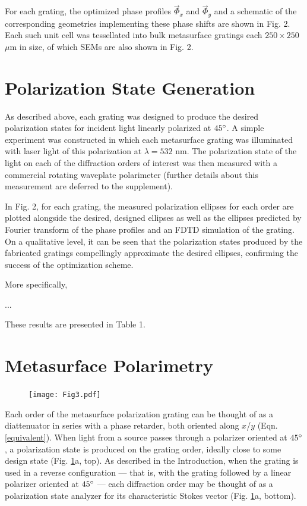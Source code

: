 \documentclass[footinbib,aps,prl,twocolumn,superscriptaddress]{revtex4-1}
\begin{document}
For each grating, the optimized phase profiles $\vec{\Phi}_x$ and $\vec{\Phi}_y$ and a schematic of the corresponding geometries implementing these phase shifts are shown in Fig. 2. Each such unit cell was tessellated into bulk metasurface gratings each $250 \times 250$ $\mu$m in size, of which SEMs are also shown in Fig. 2.

\section{Polarization State Generation}

As described above, each grating was designed to produce the desired polarization states for incident light linearly polarized at $45\degree$. A simple experiment was constructed in which each metasurface grating was illuminated with laser light of this polarization at $\lambda=532$ nm. The polarization state of the light on each of the diffraction orders of interest was then measured with a commercial rotating waveplate polarimeter (further details about this measurement are deferred to the supplement).

In Fig. 2, for each grating, the measured polarization ellipses for each order are plotted alongside the desired, designed ellipses as well as the ellipses predicted by Fourier transform of the phase profiles and an FDTD simulation of the grating. On a qualitative level, it can be seen that the polarization states produced by the fabricated gratings compellingly approximate the desired ellipses, confirming the success of the optimization scheme.

More specifically, 

...

These results are presented in Table 1.

\section{Metasurface Polarimetry}

\begin{figure}[!htp]
	\centering
	\texttt{[image: Fig3.pdf]}
	\caption{\label{fig:fig3}}
\end{figure}

Each order of the metasurface polarization grating can be thought of as a diattenuator in series with a phase retarder, both oriented along $x$/$y$ (Eqn. \ref{equivalent}). When light from a source passes through a polarizer oriented at $45\degree$, a polarization state is produced on the grating order, ideally close to some design state (Fig. \ref{fig:fig3}a, top). As described in the Introduction, when the grating is used in a reverse configuration --- that is, with the grating followed by a linear polarizer oriented at $45\degree$ --- each diffraction order may be thought of as a polarization state analyzer for its characteristic Stokes vector (Fig. \ref{fig:fig3}a, bottom).
\end{document}
